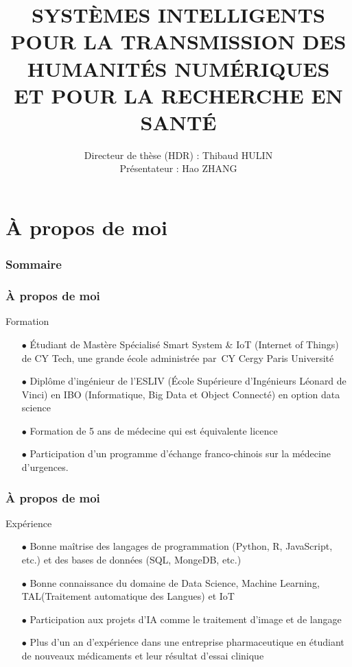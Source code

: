 \documentclass[xcolor=dvipsnames]{beamer}
\title[SYSTÈMES INTELLIGENTS]{\textsc{SYSTÈMES INTELLIGENTS \\\normalsize{POUR LA TRANSMISSION DES \\HUMANITÉS NUMÉRIQUES \\ET POUR LA RECHERCHE EN SANTÉ}}}
\institute{\large{\texttt{LECLA}}}
\author{Directeur de thèse (HDR) : Thibaud HULIN
\\Présentateur : Hao ZHANG}
\date{\displaydate{date}}
\begin{document}
\begin{frame}
	\titlepage
\end{frame}

\section{À propos de moi}

\begin{frame}
	\frametitle{Sommaire}
	\tableofcontents[currentsection]
\end{frame}

\begin{frame}[fragile]
	\frametitle{À propos de moi}
		\begin{block}{Formation}
			\begin{itemize}
				\item[$\bullet$]Étudiant de Mastère Spécialisé Smart System \& IoT (Internet of Things) de CY Tech, une grande école administrée par CY Cergy Paris Université
				\item[$\bullet$]Diplôme d'ingénieur de l'ESLIV (École Supérieure d'Ingénieurs Léonard de Vinci) en IBO (Informatique, Big Data et Object Connecté) en option data science
				\item[$\bullet$]Formation de 5 ans de médecine qui est équivalente licence
				\item[$\bullet$]Participation d'un programme d'échange franco-chinois sur la médecine d'urgences.
			\end{itemize}
		\end{block}
\vspace{1.2cm}
\end{frame}

\begin{frame}[fragile]
\frametitle{À propos de moi}
\begin{block}{Expérience}
	\begin{itemize}
		\item[$\bullet$]Bonne maîtrise des langages de programmation (Python, R, JavaScript, etc.) et des bases de données (SQL, MongeDB, etc.)
		\item[$\bullet$]Bonne connaissance du domaine de Data Science, Machine Learning, TAL(Traitement automatique des Langues) et IoT
		\item[$\bullet$]Participation aux projets d'IA comme le traitement d'image et de langage
		\item[$\bullet$]Plus d'un an d'expérience dans une entreprise pharmaceutique en étudiant de nouveaux médicaments et leur résultat d'essai clinique
	\end{itemize}
\end{block}
\vspace{1.1cm}
\end{frame}
\end{document}

